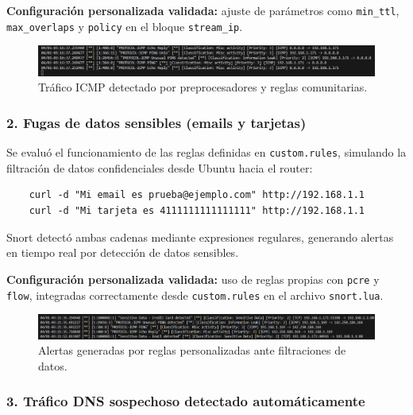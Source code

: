 \documentclass[12pt,a4paper]{report}
\begin{document}
\textbf{Configuración personalizada validada:} ajuste de parámetros como \texttt{min\_ttl}, \texttt{max\_overlaps} y \texttt{policy} en el bloque \texttt{stream\_ip}.

\begin{figure}[H]
	\centering
	\includegraphics[width=\textwidth]{pruebas/3.png}
	\caption{Tráfico ICMP detectado por preprocesadores y reglas comunitarias.}
\end{figure}

\vspace{0.5cm}

\subsubsection*{2. Fugas de datos sensibles (emails y tarjetas)}

Se evaluó el funcionamiento de las reglas definidas en \texttt{custom.rules}, simulando la filtración de datos confidenciales desde Ubuntu hacia el router:

\begin{verbatim}
	curl -d "Mi email es prueba@ejemplo.com" http://192.168.1.1
	curl -d "Mi tarjeta es 4111111111111111" http://192.168.1.1
\end{verbatim}

Snort detectó ambas cadenas mediante expresiones regulares, generando alertas en tiempo real por detección de datos sensibles.

\textbf{Configuración personalizada validada:} uso de reglas propias con \texttt{pcre} y \texttt{flow}, integradas correctamente desde \texttt{custom.rules} en el archivo \texttt{snort.lua}.

\begin{figure}[H]
	\centering
	\includegraphics[width=\textwidth]{pruebas/4.png}
	\caption{Alertas generadas por reglas personalizadas ante filtraciones de datos.}
\end{figure}

\vspace{0.5cm}

\subsubsection*{3. Tráfico DNS sospechoso detectado automáticamente}
\end{document}

